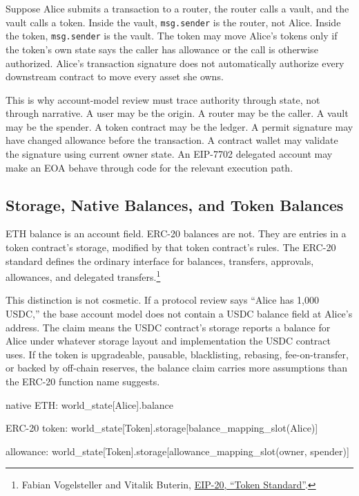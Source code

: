 Suppose Alice submits a transaction to a router, the router calls a vault, and the vault calls a token. Inside the vault, \texttt{msg.sender} is the router, not Alice. Inside the token, \texttt{msg.sender} is the vault. The token may move Alice's tokens only if the token's own state says the caller has allowance or the call is otherwise authorized. Alice's transaction signature does not automatically authorize every downstream contract to move every asset she owns.

This is why account-model review must trace authority through state, not through narrative. A user may be the origin. A router may be the caller. A vault may be the spender. A token contract may be the ledger. A permit signature may have changed allowance before the transaction. A contract wallet may validate the signature using current owner state. An EIP-7702 delegated account may make an EOA behave through code for the relevant execution path.

\subsection{Storage, Native Balances, and Token Balances}

ETH balance is an account field. ERC-20 balances are not. They are entries in a token contract's storage, modified by that token contract's rules. The ERC-20 standard defines the ordinary interface for balances, transfers, approvals, allowances, and delegated transfers.\footnote{Fabian Vogelsteller and Vitalik Buterin, \href{https://eips.ethereum.org/EIPS/eip-20}{EIP-20, ``Token Standard''}.}

This distinction is not cosmetic. If a protocol review says ``Alice has 1,000 USDC,'' the base account model does not contain a USDC balance field at Alice's address. The claim means the USDC contract's storage reports a balance for Alice under whatever storage layout and implementation the USDC contract uses. If the token is upgradeable, pausable, blacklisting, rebasing, fee-on-transfer, or backed by off-chain reserves, the balance claim carries more assumptions than the ERC-20 function name suggests.

\begin{codeblock}
native ETH:
    world_state[Alice].balance

ERC-20 token:
    world_state[Token].storage[balance_mapping_slot(Alice)]

allowance:
    world_state[Token].storage[allowance_mapping_slot(owner, spender)]
\end{codeblock}

